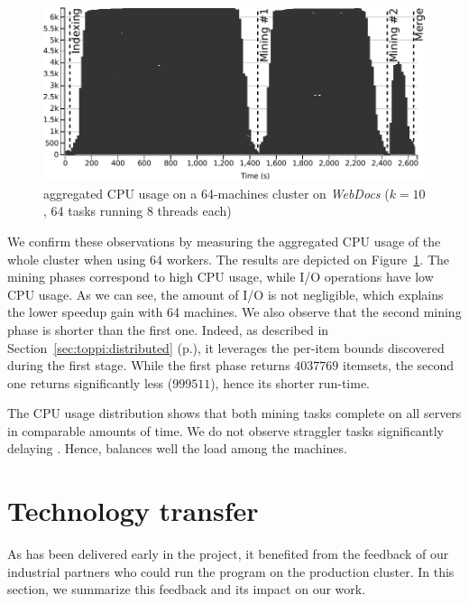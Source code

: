 \begin{figure}
	\centering
	\includegraphics[]{fig/toppi/hadoopCpuLoad-webdocs-s2-k10-t8-g64-c.pdf}
	\caption{\label{fig:hadoopCpuLoad}
		\toppi aggregated CPU usage on a 64-machines cluster on \textit{WebDocs}
		($k=10$, 64 tasks running 8 threads each)
	}
\end{figure}

We confirm these observations by measuring the aggregated CPU usage of the whole cluster when using 64 workers.
The results are depicted on Figure~\ref{fig:hadoopCpuLoad}.
The mining phases correspond to high CPU usage, while I/O operations have low CPU usage.
As we can see, the amount of I/O is not negligible, which explains the lower speedup gain with 64 machines.
We also observe that the second mining phase is shorter than the first one.
Indeed, as described in Section~\ref{sec:toppi:distributed} (p.\pageref{sec:toppi:distributed}),
it leverages the per-item bounds discovered during the first stage.
While the first phase returns $\num{4037769}$ itemsets,
the second one returns significantly less ($\num{999511}$),
hence its shorter run-time.

The CPU usage distribution shows that both mining tasks complete on all servers in comparable amounts of time.
We do not observe straggler tasks significantly delaying \toppi.
Hence, \toppi balances well the load among the machines.












\section{Technology transfer}
\label{sec:toppi:integration}

As \toppi has been delivered early in the \datalyse project,
it benefited from the feedback of our industrial partners
who could run the program on the production cluster.
In this section, we summarize this feedback and its impact on our work.

